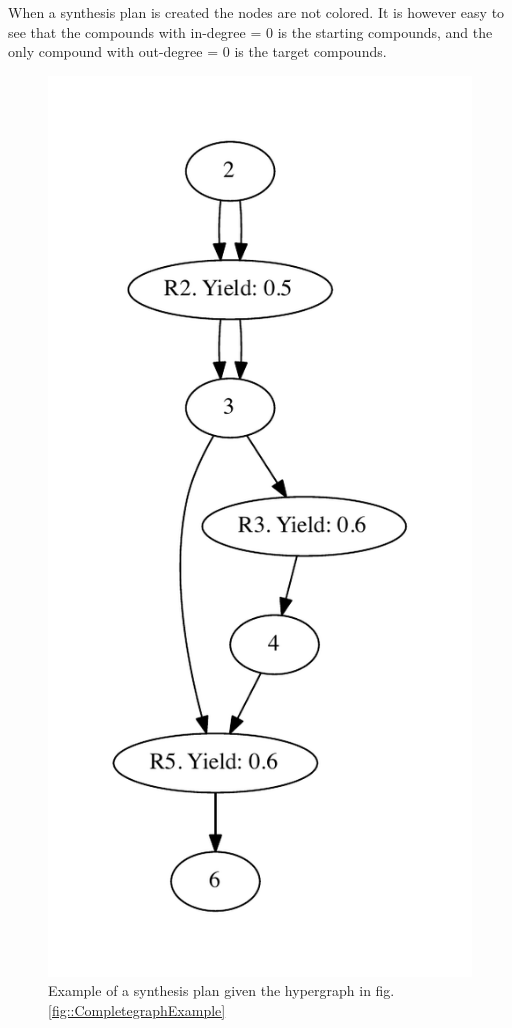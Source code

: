 \documentclass[a4paper,10pt,titlepage]{paper}
\begin{document}
When a synthesis plan is created the nodes are not colored. It is however easy to see that the compounds with in-degree = 0 is the starting compounds, and the only compound with out-degree = 0 is the target compounds.
\begin{figure}[H]
\centering
\includegraphics[scale=0.5]{Billeder/SynthplanExample.pdf}
\caption{Example of a synthesis plan given the hypergraph in fig. \ref{fig::CompletegraphExample} }
\end{figure}
\end{document}

